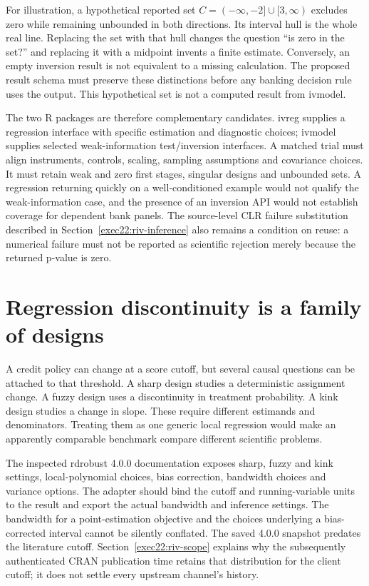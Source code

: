 For illustration, a hypothetical reported set
\(C=(-\infty,-2]\cup[3,\infty)\) excludes zero while remaining unbounded in both
directions. Its interval hull is the whole real line. Replacing the set with
that hull changes the question ``is zero in the set?'' and replacing it with a
midpoint invents a finite estimate. Conversely, an empty inversion result is
not equivalent to a missing calculation. The proposed result schema must
preserve these distinctions before any banking decision rule uses the output.
This hypothetical set is not a computed result from ivmodel.

The two R packages are therefore complementary candidates. ivreg supplies a
regression interface with specific estimation and diagnostic choices; ivmodel
supplies selected weak-information test/inversion interfaces. A matched trial
must align instruments, controls, scaling, sampling assumptions and covariance
choices. It must retain weak and zero first stages, singular designs and
unbounded sets. A regression returning quickly on a well-conditioned example
would not qualify the weak-information case, and the presence of an inversion
API would not establish coverage for dependent bank panels.
The source-level CLR failure substitution described in
Section~\ref{exec22:riv-inference} also remains a condition on reuse:
a numerical failure must not be reported as scientific rejection merely
because the returned p-value is zero.

\section{Regression discontinuity is a family of designs}

A credit policy can change at a score cutoff, but several causal questions can
be attached to that threshold. A sharp design studies a deterministic assignment
change. A fuzzy design uses a discontinuity in treatment probability. A kink
design studies a change in slope. These require different estimands and
denominators. Treating them as one generic local regression would make an
apparently comparable benchmark compare different scientific problems.

The inspected rdrobust 4.0.0 documentation exposes sharp, fuzzy and kink
settings, local-polynomial choices, bias correction, bandwidth choices and
variance options. The adapter should bind the cutoff and running-variable
units to the result and export the actual bandwidth and inference settings.
The bandwidth for a point-estimation objective and the choices underlying a
bias-corrected interval cannot be silently conflated. The saved 4.0.0 snapshot
predates the literature cutoff. Section~\ref{exec22:riv-scope} explains why
the subsequently authenticated CRAN publication time retains that distribution
for the client cutoff; it does not settle every upstream channel's history.
\citep{v12_sw_rdrobust}

